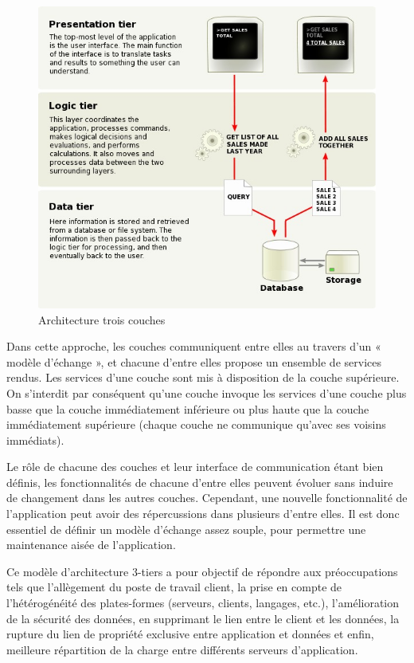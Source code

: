 \begin{figure}[H]
\begin{center}
    \includegraphics[scale=0.6]{img/3-tier}
    \caption{Architecture trois couches}
	\label{3-tier}
\end{center}
\end{figure}

Dans cette approche, les couches communiquent entre elles au travers d'un « modèle d'échange », et chacune d'entre elles propose un ensemble de services rendus. Les services d'une couche sont mis à disposition de la couche supérieure. On s'interdit par conséquent qu'une couche invoque les services d'une couche plus basse que la couche immédiatement inférieure ou plus haute que la couche immédiatement supérieure (chaque couche ne communique qu'avec ses voisins immédiats).

Le rôle de chacune des couches et leur interface de communication étant bien définis, les fonctionnalités de chacune d'entre elles peuvent évoluer sans induire de changement dans les autres couches. Cependant, une nouvelle fonctionnalité de l'application peut avoir des répercussions dans plusieurs d'entre elles. Il est donc essentiel de définir un modèle d'échange assez souple, pour permettre une maintenance aisée de l'application.

Ce modèle d'architecture 3-tiers a pour objectif de répondre aux préoccupations tels que l'allègement du poste de travail client, la prise en compte de l'hétérogénéité des plates-formes (serveurs, clients, langages, etc.), l'amélioration de la sécurité des données, en supprimant le lien entre le client et les données, la rupture du lien de propriété exclusive entre application et données et enfin, meilleure répartition de la charge entre différents serveurs d'application. \cite{3-tiers}

